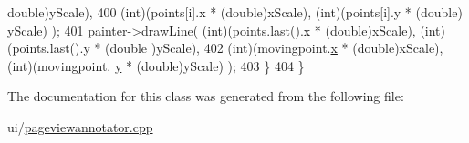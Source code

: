 \begin{DoxyCode}
{      double})yScale),
400                                        (\textcolor{keywordtype}{int})(points[i].x * (\textcolor{keywordtype}{double})xScale), (\textcolor{keywordtype}{int})(points[i].y * (\textcolor{keywordtype}{double})
      yScale) );
401                 painter->drawLine( (\textcolor{keywordtype}{int})(points.last().x * (double)xScale), (int)(points.last().y * (double
      )yScale),
402                                    (int)(movingpoint.\hyperlink{classOkular_1_1NormalizedPoint_a857f49b9bc7712430d167472ef9dbd94}{x} * (\textcolor{keywordtype}{double})xScale), (\textcolor{keywordtype}{int})(movingpoint.
      \hyperlink{classOkular_1_1NormalizedPoint_ac2276daabda627d5f82bb1532c293047}{y} * (double)yScale) );
403             \}
404         \}
\end{DoxyCode}


The documentation for this class was generated from the following file\+:\begin{DoxyCompactItemize}
\item 
ui/\hyperlink{pageviewannotator_8cpp}{pageviewannotator.\+cpp}\end{DoxyCompactItemize}
